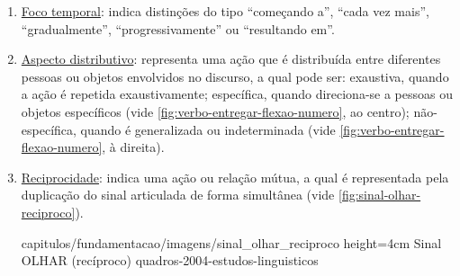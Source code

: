 \begin{enumerate}
\begin{enumerate}
            {capitulos/fundamentacao/imagens/verbo_cuidar_flexao_temporal} %
            {height=5cm} %
            {Verbo CUIDAR flexionado em aspecto temporal incessante (esquerda), ininterrupto (centro) e habitual (direita)} %
            {quadros-2004-estudos-linguisticos} %


        \item \underline{Foco temporal}: indica distinções do tipo ``começando a'', ``cada vez mais'', ``gradualmente'', ``progressivamente'' ou ``resultando em''.


        \item \underline{Aspecto distributivo}: representa uma ação que é distribuída entre diferentes pessoas ou objetos envolvidos no discurso, a qual pode ser: exaustiva, quando a ação é repetida exaustivamente; específica, quando direciona-se a pessoas ou objetos específicos (vide \autoref{fig:verbo-entregar-flexao-numero}, ao centro); não-específica, quando é generalizada ou indeterminada (vide \autoref{fig:verbo-entregar-flexao-numero}, à direita).
        
        
        \item \underline{Reciprocidade}: indica uma ação ou relação mútua, a qual é representada pela duplicação do sinal articulada de forma simultânea (vide \autoref{fig:sinal-olhar-reciproco}).
        
            {capitulos/fundamentacao/imagens/sinal_olhar_reciproco} %
            {height=4cm} %
            {Sinal OLHAR (recíproco)} %
            {quadros-2004-estudos-linguisticos} %
                
    \end{enumerate}



\end{enumerate}



